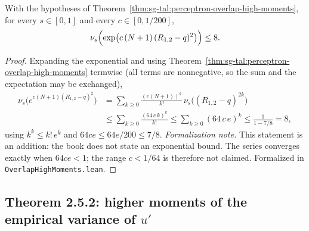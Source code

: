 \begin{proposition}\label{prop:sg-tal:perceptron-overlap-exponential}
  \leanok
With the hypotheses of Theorem~\ref{thm:sg-tal:perceptron-overlap-high-moments}, for every $s\in[0,1]$ and every
$c\in[0,1/200]$,
\[
 \nu_s\Bigl(\exp\bigl(c\,(N+1)\,(R_{1,2}-q)^2\bigr)\Bigr)\le 8 .
\]
\end{proposition}
\begin{proof}
  \leanok
Expanding the exponential and using Theorem~\ref{thm:sg-tal:perceptron-overlap-high-moments} termwise (all terms
are nonnegative, so the sum and the expectation may be exchanged),
\begin{align*}
 \nu_s\bigl(e^{c(N+1)(R_{1,2}-q)^2}\bigr)&=\sum_{k\ge0}\frac{(c(N+1))^k}{k!}\,\nu_s\bigl((R_{1,2}-q)^{2k}\bigr)\\
 &\le\sum_{k\ge0}\frac{(64\,c\,k)^k}{k!}\le\sum_{k\ge0}(64\,c\,e)^k\le\frac{1}{1-7/8}=8,
\end{align*}
using $k^k\le k!\,e^k$ and $64ce\le 64e/200\le 7/8$. \emph{Formalization note.} This statement is an addition: the
book does not state an exponential bound. The series converges exactly when $64ce<1$; the range $c<1/64$ is
therefore not claimed. Formalized in \texttt{OverlapHighMoments.lean}.
\end{proof}

\subsection{Theorem 2.5.2: higher moments of the empirical variance of $u'$}\label{sub:sg-tal:perceptron-exponential-variance}


